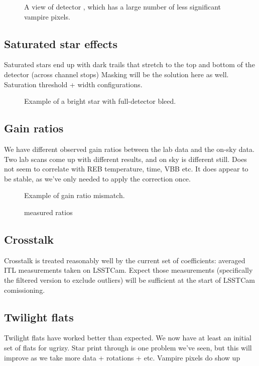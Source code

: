 \begin{figure}
  \caption{A view of detector , which has a large number of less significant vampire pixels.}
\end{figure}


\subsection{Saturated star effects}

Saturated stars end up with dark trails that stretch to the top and bottom of the detector (across channel stops)
Masking will be the solution here as well.  Saturation threshold + width configurations.

\begin{figure}
  \caption{Example of a bright star with full-detector bleed.}
\end{figure}

\subsection{Gain ratios}
We have different observed gain ratios between the lab data and the on-sky data.
Two lab scans come up with different results, and on sky is different still.
Does not seem to correlate with REB temperature, time, VBB etc.
It does appear to be stable, as we've only needed to apply the correction once.

\begin{figure}
  \caption{Example of gain ratio mismatch.}
\end{figure}

\begin{figure}
  \caption{measured ratios}
\end{figure}

\subsection{Crosstalk}

Crosstalk is treated reasonably well by the current set of coefficients: averaged ITL measurements taken on LSSTCam.
Expect those measurements (specifically the filtered version to exclude outliers) will be sufficient at the start of LSSTCam comissioning.

\subsection{Twilight flats}

Twilight flats have worked better than expected.
We now have at least an initial set of flats for ugrizy.
Star print through is one problem we've seen, but this will improve as we take more data + rotations + etc.
Vampire pixels do show up

